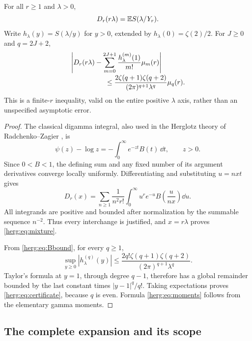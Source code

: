 \begin{theorem}
\label{herg:thm:mixture}
For all $r\geq1$ and $\lambda>0$,
\begin{equation}\label{herg:eq:mixture}
 D_r(r\lambda)=\mathbb E S(\lambda/Y_r).
\end{equation}
Write $h_\lambda(y)=S(\lambda/y)$ for $y>0$, extended by
$h_\lambda(0)=\zeta(2)/2$. For $J\geq0$ and $q=2J+2$,
\begin{align}
 &\left|D_r(r\lambda)-
   \sum_{m=0}^{2J+1}\frac{h_\lambda^{(m)}(1)}{m!}\mu_m(r)\right|
 \label{herg:eq:certificate}\\[-2pt]
 &\hspace{18mm}\leq
 \frac{2\zeta(q+1)\zeta(q+2)}{(2\pi)^{q+1}\lambda^q}\mu_q(r).
 \notag
\end{align}
This is a finite-$r$ inequality, valid on the entire positive
$\lambda$ axis, rather than an unspecified asymptotic error.
\end{theorem}
\begin{proof}
The classical digamma integral, also used in the Herglotz theory of
Radchenko--Zagier \cite{herg:RadchenkoZagier}, is
\[
 \psi(z)-\log z=-\int_0^\infty e^{-zt}B(t)\,\dd t,
 \qquad z>0.
\]
Since $0<B<1$, the defining sum and any fixed number of its
argument derivatives converge locally uniformly. Differentiating and
substituting $u=nxt$ gives
\begin{equation}\label{herg:eq:pre-mixture}
 D_r(x)=\sum_{n\geq1}\frac1{n^2r!}
           \int_0^\infty u^r e^{-u}B\left(\frac{u}{nx}\right)\dd u.
\end{equation}
All integrands are positive and bounded after normalization by the
summable sequence $n^{-2}$. Thus every interchange is justified, and
$x=r\lambda$ proves \eqref{herg:eq:mixture}.

From \eqref{herg:eq:Bbound}, for every $q\geq1$,
\[
 \sup_{y\geq0}|h_\lambda^{(q)}(y)|
 \leq \frac{2q!\zeta(q+1)\zeta(q+2)}
                    {(2\pi)^{q+1}\lambda^q}.
\]
Taylor's formula at $y=1$, through degree $q-1$, therefore has a
global remainder bounded by the last constant times $|y-1|^q/q!$.
Taking expectations proves \eqref{herg:eq:certificate}, because $q$
is even. Formula \eqref{herg:eq:moments} follows from the elementary
gamma moments.
\end{proof}

\subsection{The complete expansion and its scope}


